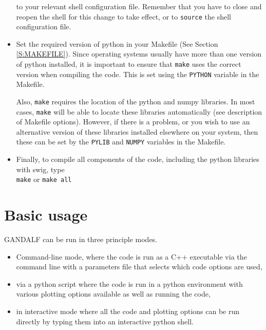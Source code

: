 \documentclass[a4paper]{article}
\newcommand{\var}[1]{\texttt{#1}}
\begin{document}
\begin{itemize}
\noindent to your relevant shell configuration file. Remember that you have to close and reopen the shell for this change to take effect, or to \var{source} the shell configuration file.

\item Set the required version of python in your Makefile (See Section \ref{S:MAKEFILE}).  Since operating systems usually have more than one version of python installed, it is important to ensure that \var{make} uses the correct version when compiling the code.  This is set using the \var{PYTHON} variable in the Makefile.

Also, \var{make} requires the location of the python and numpy libraries.  In most cases, \var{make} will be able to locate these libraries automatically (see description of Makefile options).  However, if there is a problem, or you wish to use an alternative version of these libraries installed elsewhere on your system, then these can be set by the \var{PYLIB} and \var{NUMPY} variables in the Makefile.


\item Finally, to compile all components of the code, including the python libraries with swig, type \\
\newline
\noindent \var{make} or \var{make all} \\

\end{itemize}

\newpage


\section{Basic usage}
GANDALF can be run in three principle modes.
\begin{itemize}
\item Command-line mode, where the code is run as a C++ executable via the command line with a parameters file that selects which code options are used,
\item via a python script where the code is run in a python environment with various plotting options available as well as running the code,
\item in interactive mode where all the code and plotting options can be run directly by typing them into an interactive python shell.
\end{itemize}
\end{document}
